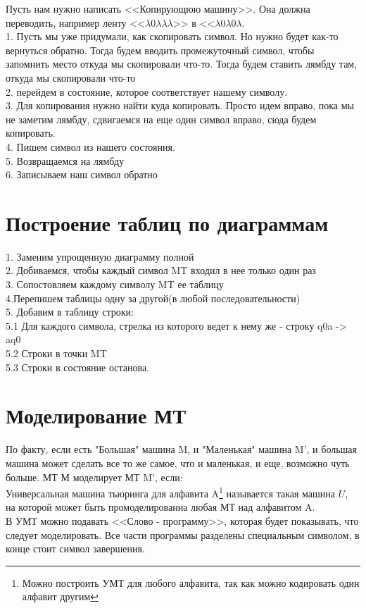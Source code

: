 \documentclass[a4paper,12pt]{article}
\begin{document}
Пусть нам нужно написать <<Копирующюю машину>>. Она должна переводить, например ленту <<$\lambda 0\lambda \lambda \lambda$>> в <<$\lambda 0\lambda 0 \lambda$. \\
1. Пусть мы уже придумали, как скопировать символ. Но нужно будет как-то вернуться обратно. Тогда будем вводить промежуточный символ, чтобы запомнить место откуда мы скопировали что-то. Тогда будем ставить лямбду там, откуда мы скопировали что-то\\
2. перейдем в состояние, которое соответствует нашему символу.\\
3. Для копирования нужно найти куда копировать. Просто идем вправо, пока мы не заметим лямбду, сдвигаемся на еще один символ вправо, сюда будем копировать. \\
4. Пишем символ из нашего состояния. \\
5. Возвращаемся на лямбду\\
6. Записываем наш символ обратно\\
\section{Построение таблиц по диаграммам}
1. Заменим упрощенную диаграмму полной\\
2. Добиваемся, чтобы каждый символ MT входил в нее только один раз\\
3. Сопостовляем каждому символу MT ее таблицу\\
4.Перепишем таблицы одну за другой(в любой последовательности)\\
5. Добавим в таблицу строки:\\
5.1 Для каждого символа, стрелка из которого ведет к нему же - строку q0a -> aq0\\
5.2 Строки в точки MT\\
5.3 Строки в состояние останова.\\
\section{Моделирование МТ}
По факту, если есть "Большая" машина M, и "Маленькая" машина M', и большая машина может сделать все то же самое, что и маленькая, и еще, возможно чуть больше.
МТ М моделирует МТ M', если:\\

Универсальная машина тьюринга для алфавита A\footnote{Можно построить УМТ для любого алфавита, так как можно кодировать один алфавит другим} называется такая машина $U$, на которой может быть промоделированна любая МТ над алфавитом A.\\
В УМТ можно подавать <<Слово - программу>>, которая будет показывать, что следует моделировать. Все части программы разделены специальным символом, в конце стоит символ завершения.
\end{document}
